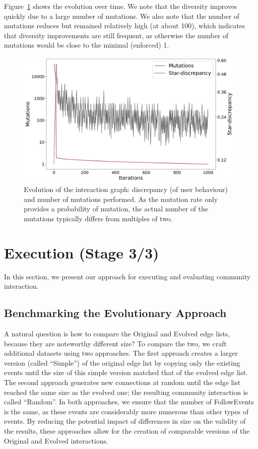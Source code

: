 \documentclass[dvipsnames,format=sigconf,anonymous=False,review=false, balance=false]{acmart}
\begin{document}
Figure~\ref{fig:convergence} shows the evolution over time. We note that the diversity improves quickly due to a large number of mutations. We also note that the number of mutations reduces but remained relatively high (at about 100), which indicates that diversity improvements are still frequent, as otherwise the number of mutations would be close to the minimal (enforced) 1.

\begin{figure}
\centering
\includegraphics[width=\linewidth,trim=0 0 0 0,clip]{fig13.pdf}
\vspace{-7mm}
\caption{Evolution of the interaction graph: discrepancy (of user behaviour) and number of mutations performed. As the mutation rate only provides a probability of mutation, the actual number of the mutations typically differs from multiples of two.}
\label{fig:convergence}
\end{figure}

\section{Execution (Stage 3/3)}\label{sec:eval}

In this section, we present our approach for executing and evaluating community interaction. 

\subsection{Benchmarking the Evolutionary Approach}

A natural question is how to compare the Original and Evolved edge lists, because they are noteworthy different size? To compare the two, we craft additional datasets using two approaches. The first approach creates a larger version (called ``Simple'') of the original edge list by copying only the existing events until the size of this simple version matched that of the evolved edge list. The second approach generates new connections at random until the edge list reached the same size as the evolved one; the resulting community interaction is called ``Random''. In both approaches, we ensure that the number of FollowEvents is the same, as these events are considerably more numerous than other types of events. 
By reducing the potential impact of differences in size on the validity of the results, these approaches allow for the creation of comparable versions of the Original and Evolved interactions. 
\end{document}
